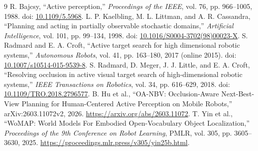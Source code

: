\documentclass[10pt,twocolumn,a4paper]{article}
\begin{document}
\begin{thebibliography}{9}
 R. Bajcsy, ``Active perception,'' \emph{Proceedings of the IEEE}, vol. 76, pp. 966--1005, 1988. doi: \href{https://doi.org/10.1109/5.5968}{10.1109/5.5968}.
 L. P. Kaelbling, M. L. Littman, and A. R. Cassandra, ``Planning and acting in partially observable stochastic domains,'' \emph{Artificial Intelligence}, vol. 101, pp. 99--134, 1998. doi: \href{https://doi.org/10.1016/S0004-3702(98)00023-X}{10.1016/S0004-3702(98)00023-X}.
 S. Radmard and E. A. Croft, ``Active target search for high dimensional robotic systems,'' \emph{Autonomous Robots}, vol. 41, pp. 163--180, 2017 (online 2015). doi: \href{https://doi.org/10.1007/s10514-015-9539-8}{10.1007/s10514-015-9539-8}.
 S. Radmard, D. Meger, J. J. Little, and E. A. Croft, ``Resolving occlusion in active visual target search of high-dimensional robotic systems,'' \emph{IEEE Transactions on Robotics}, vol. 34, pp. 616--629, 2018. doi: \href{https://doi.org/10.1109/TRO.2018.2796577}{10.1109/TRO.2018.2796577}.
 B. Hu et al., ``OA-NBV: Occlusion-Aware Next-Best-View Planning for Human-Centered Active Perception on Mobile Robots,'' arXiv:2603.11072v2, 2026. \url{https://arxiv.org/abs/2603.11072}.
 T. Yin et al., ``WoMAP: World Models For Embodied Open-Vocabulary Object Localization,'' \emph{Proceedings of the 9th Conference on Robot Learning}, PMLR, vol. 305, pp. 3605--3630, 2025. \url{https://proceedings.mlr.press/v305/yin25b.html}.
\end{thebibliography}
\end{document}
